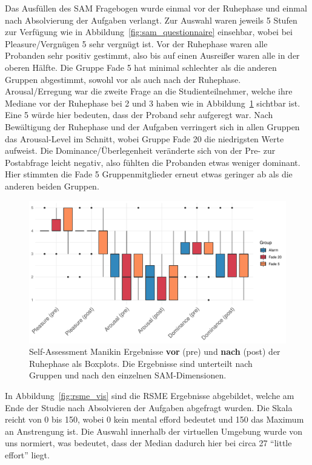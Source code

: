 Das Ausfüllen des SAM Fragebogen wurde einmal vor der Ruhephase und einmal nach Absolvierung der Aufgaben verlangt. Zur Auswahl waren jeweils 5 Stufen zur Verfügung wie in Abbildung~\ref{fig:sam_questionnaire} einsehbar, wobei bei Pleasure/Vergnügen 5 sehr vergnügt ist. Vor der Ruhephase waren alle Probanden sehr positiv gestimmt, also bis auf einen Ausreißer waren alle in der oberen Hälfte. Die Gruppe Fade 5 hat minimal schlechter als die anderen Gruppen abgestimmt, sowohl vor als auch nach der Ruhephase. Arousal/Erregung war die zweite Frage an die Studienteilnehmer, welche ihre Mediane vor der Ruhephase bei 2 und 3 haben wie in Abbildung~\ref{fig:samResults} sichtbar ist. Eine 5 würde hier bedeuten, dass der Proband sehr aufgeregt war. 
Nach Bewältigung der Ruhephase und der Aufgaben verringert sich in allen Gruppen das Arousal-Level im Schnitt, wobei Gruppe Fade 20 die niedrigsten Werte aufweist. Die Dominance/Überlegenheit veränderte sich von der Pre- zur Postabfrage leicht negativ, also fühlten die Probanden etwas weniger dominant. Hier stimmten die Fade 5 Gruppenmitglieder erneut etwas geringer ab als die anderen beiden Gruppen.

\begin{figure}[H]
	\centering
	\includegraphics[width=\textwidth]{./_StudyResults/SAMresults}
	\caption{Self-Assessment Manikin Ergebnisse \textbf{vor} (pre) und \textbf{nach} (post) der Ruhephase als Boxplots. Die Ergebnisse sind unterteilt nach Gruppen und nach den einzelnen SAM-Dimensionen.}
	\label{fig:samResults}
\end{figure}

In Abbildung~\ref{fig:rsme_vis} sind die RSME Ergebnisse abgebildet, welche am Ende der Studie nach Absolvieren der Aufgaben abgefragt wurden. Die Skala reicht von 0 bis 150, wobei 0 kein mental efford bedeutet und 150 das Maximum an Anstrengung ist. Die Auswahl innerhalb der virtuellen Umgebung wurde von uns normiert, was bedeutet, dass der Median dadurch hier bei circa 27 "`little effort"' liegt.


